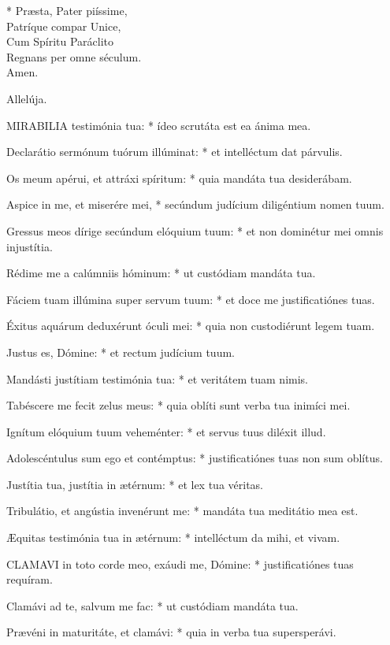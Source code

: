 * Præsta, Pater piíssime,\\
Patríque compar Unice,\\
Cum Spíritu Paráclito\\
Regnans per omne séculum.\\
Amen.

  Allelúja.


\lettrine[lines=2]{M}{IRABILIA} testimónia tua: * ídeo scrutáta est ea ánima mea.

Declarátio sermónum tuórum illúminat: * et intelléctum dat párvulis.

Os meum apérui, et attráxi spíritum: * quia mandáta tua desiderábam.

Aspice in me, et miserére mei, * secúndum judícium diligéntium nomen tuum.

Gressus meos dírige secúndum elóquium tuum: * et non dominétur mei omnis injustítia.

Rédime me a calúmniis hóminum: * ut custódiam mandáta tua.

Fáciem tuam illúmina super servum tuum: * et doce me justificatiónes tuas.

Éxitus aquárum deduxérunt óculi mei: * quia non custodiérunt legem tuam.

Justus es, Dómine: * et rectum judícium tuum.

Mandásti justítiam testimónia tua: * et veritátem tuam nimis.

Tabéscere me fecit zelus meus: * quia oblíti sunt verba tua inimíci mei.

Ignítum elóquium tuum veheménter: * et servus tuus diléxit illud.

Adolescéntulus sum ego et contémptus: * justificatiónes tuas non sum oblítus.

Justítia tua, justítia in ætérnum: * et lex tua véritas.

Tribulátio, et angústia invenérunt me: * mandáta tua meditátio mea est.

Æquitas testimónia tua in ætérnum: * intelléctum da mihi, et vivam.


\lettrine[lines=2]{C}{LAMAVI} in toto corde meo, exáudi me, Dómine: * justificatiónes tuas requíram.

Clamávi ad te, salvum me fac: * ut custódiam mandáta tua.

Prævéni in maturitáte, et clamávi: * quia in verba tua supersperávi.

